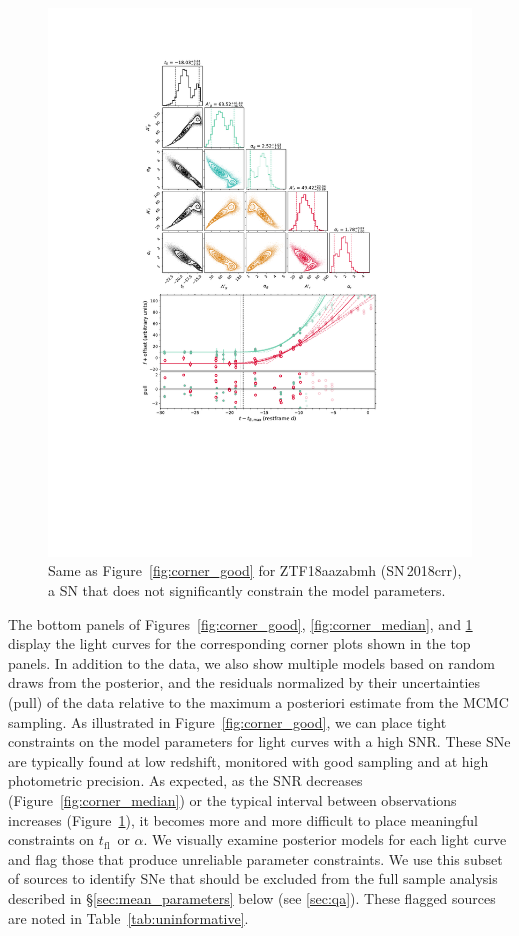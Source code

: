 \documentclass[twocolumn]{aastex63}
\newcommand{\tfl}{$t_\mathrm{fl}$}
\begin{document}
\begin{figure}
    \centering
    \includegraphics[width=5.2in]{./figures/Fig3.pdf}
    \caption{Same as Figure~\ref{fig:corner_good} for ZTF18aazabmh
    (SN\,2018crr), a SN that does not significantly constrain the model
    parameters.}
    \label{fig:corner_bad}
\end{figure}

The bottom panels of Figures~\ref{fig:corner_good}, \ref{fig:corner_median},
and \ref{fig:corner_bad} display the light curves for the corresponding corner
plots shown in the top panels. In addition to the data, we also show multiple
models based on random draws from the posterior, and the residuals normalized
by their uncertainties (pull) of the data relative to the maximum a posteriori
estimate from the MCMC sampling. As illustrated in
Figure~\ref{fig:corner_good}, we can place tight constraints on the model
parameters for light curves with a high SNR. These SNe are typically found at
low redshift, monitored with good sampling and at high photometric precision.
As expected, as the SNR decreases (Figure~\ref{fig:corner_median}) or the
typical interval between observations increases (Figure~\ref{fig:corner_bad}),
it becomes more and more difficult to place meaningful constraints on \tfl\ or
$\alpha$. We visually examine posterior models for each light curve and flag
those that produce unreliable parameter constraints. We use this subset of
sources to identify SNe that should be excluded from the full sample analysis
described in \S\ref{sec:mean_parameters} below (see \ref{sec:qa}). These
flagged sources are noted in Table~\ref{tab:uninformative}.
\end{document}
